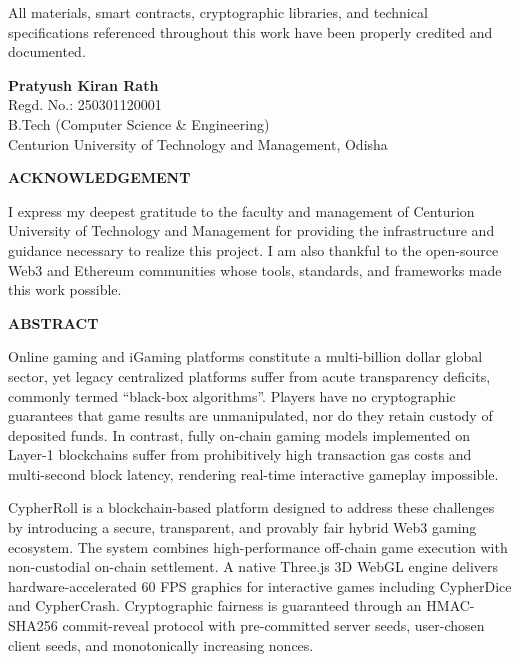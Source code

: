 All materials, smart contracts, cryptographic libraries, and technical specifications referenced throughout this work have been properly credited and documented.

\vspace{1.5cm}
\noindent
\textbf{Pratyush Kiran Rath} \\
Regd. No.: 250301120001 \\
B.Tech (Computer Science \& Engineering) \\
Centurion University of Technology and Management, Odisha

\vspace{1.5cm}
\begin{center}
    {\Large \textbf{ACKNOWLEDGEMENT}\par}
    \vspace{0.4cm}
\end{center}
I express my deepest gratitude to the faculty and management of Centurion University of Technology and Management for providing the infrastructure and guidance necessary to realize this project. I am also thankful to the open-source Web3 and Ethereum communities whose tools, standards, and frameworks made this work possible.

\newpage
\pagestyle{frontmatterstyle}
\thispagestyle{frontmatterstyle}
\begin{center}
    {\Large \textbf{ABSTRACT}\par}
    \vspace{0.8cm}
\end{center}

Online gaming and iGaming platforms constitute a multi-billion dollar global sector, yet legacy centralized platforms suffer from acute transparency deficits, commonly termed ``black-box algorithms''. Players have no cryptographic guarantees that game results are unmanipulated, nor do they retain custody of deposited funds. In contrast, fully on-chain gaming models implemented on Layer-1 blockchains suffer from prohibitively high transaction gas costs and multi-second block latency, rendering real-time interactive gameplay impossible.

CypherRoll is a blockchain-based platform designed to address these challenges by introducing a secure, transparent, and provably fair hybrid Web3 gaming ecosystem. The system combines high-performance off-chain game execution with non-custodial on-chain settlement. A native Three.js 3D WebGL engine delivers hardware-accelerated 60 FPS graphics for interactive games including CypherDice and CypherCrash. Cryptographic fairness is guaranteed through an HMAC-SHA256 commit-reveal protocol with pre-committed server seeds, user-chosen client seeds, and monotonically increasing nonces.

